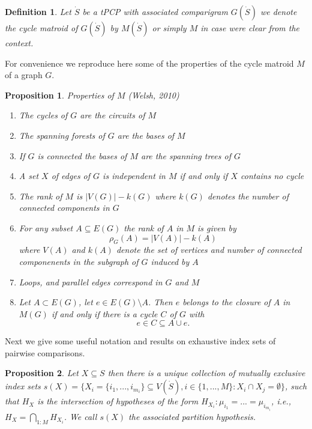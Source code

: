 \documentclass[a4paper,12pt]{article}
\newtheorem{definition}{Definition}
\newtheorem{proposition}{Proposition}
\newcommand{\ie}{{\em i.e.,}~}
\begin{document}
\begin{definition}
  Let $\dot{S}$ be a tPCP with associated comparigram $G(\dot{S})$ we
  denote the cycle matroid of $G(\dot{S})$ by $M(\dot{S})$ or simply
  $M$ in case were clear from the context. 
\end{definition}

For convenience we reproduce here some of the properties of the cycle
matroid $M$ of a graph $G$. 

\begin{proposition}{Properties of $M$ (Welsh, 2010)}
\label{the:cyclemat}
  \begin{enumerate}
  \item The cycles of $G$ are the circuits of $M$ 
  \item The spanning forests of $G$ are the bases of $M$
  \item If $G$ is connected the bases of $M$ are the spanning trees of $G$
  \item A set $X$ of edges of $G$ is independent in $M$ if and only if
    $X$ contains no cycle
  \item The rank of $M$ is $|V(G)| - k(G)$ where $k(G)$ denotes the
    number of connected components in $G$
  \item For any subset $A \subseteq E(G)$ the rank of $A$ in $M$ is
    given by
    \begin{displaymath}
      \rho_G(A) = |V(A)| - k(A)
    \end{displaymath}
    where $V(A)$ and $k(A)$ denote the set of vertices and number of
    connected componenents in the subgraph of $G$ induced by $A$
  \item Loops, and parallel edges correspond in $G$ and $M$
  \item Let $A \subset E(G)$, let $e \in E(G)\setminus A$. Then $e$
    belongs to the closure of $A$ in $M(G)$ if and only if there is a
    cycle $C$ of $G$ with
    \begin{displaymath}
      e \in C \subseteq A \cup e.
    \end{displaymath}

  \end{enumerate}
\end{proposition}

Next we give some useful notation and results on exhaustive index sets
of pairwise comparisons.

\begin{proposition}
  Let $X \subseteq S$ then there is a unique collection of mutually
  exclusive index sets $s(X) = \{X_i = \{i_1,...,i_{m_i}\} \subseteq
  V(\dot{S}), i \in \{1,...,M\}: X_i \cap X_j = \emptyset\}$, such
  that $H_X$ is the intersection of hypotheses of the form $H_{X_i}:
  \mu_{i_1} = ... = \mu_{i_{m_i}}$, \ie $H_X = \bigcap_{1:M}
  H_{X_i}$. We call $s(X)$ the {\em associated partition hypothesis}.
\end{proposition}
\end{document}
